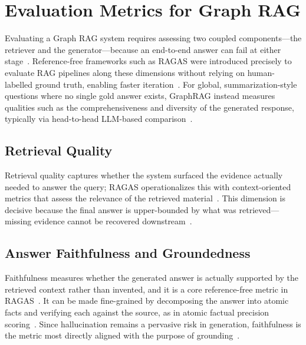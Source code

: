 \section{Evaluation Metrics for Graph RAG}
\label{sec:gr-metrics}

Evaluating a Graph RAG system requires assessing two coupled components---the
retriever and the generator---because an end-to-end answer can fail at either
stage~\cite{es2024ragas}. Reference-free frameworks such as RAGAS were introduced
precisely to evaluate RAG pipelines along these dimensions without relying on
human-labelled ground truth, enabling faster iteration~\cite{es2024ragas}. For
global, summarization-style questions where no single gold answer exists, GraphRAG
instead measures qualities such as the comprehensiveness and diversity of the
generated response, typically via head-to-head LLM-based
comparison~\cite{edge2024graphrag}.

\subsection{Retrieval Quality}

Retrieval quality captures whether the system surfaced the evidence actually
needed to answer the query; RAGAS operationalizes this with context-oriented
metrics that assess the relevance of the retrieved material~\cite{es2024ragas}.
This dimension is decisive because the final answer is upper-bounded by what was
retrieved---missing evidence cannot be recovered downstream~\cite{gao2023ragsurvey}.

\subsection{Answer Faithfulness and Groundedness}

Faithfulness measures whether the generated answer is actually supported by the
retrieved context rather than invented, and it is a core reference-free metric in
RAGAS~\cite{es2024ragas}. It can be made fine-grained by decomposing the answer
into atomic facts and verifying each against the source, as in atomic factual
precision scoring~\cite{min2023factscore}. Since hallucination remains a pervasive
risk in generation, faithfulness is the metric most directly aligned with the
purpose of grounding~\cite{ji2023hallucination}.
